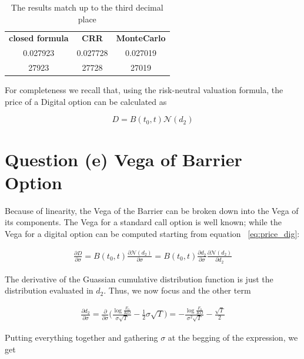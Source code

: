 \begin{table}[H]
    \centering
    \begin{tabular}{|| c | c | c ||}
    \hline
        \textbf{closed formula} & \textbf{CRR} & \textbf{MonteCarlo} \\
        0.027923 & 0.027728 & 0.027019 \\
        27923 & 27728 & 27019 \\
    \hline
    \end{tabular}
    \caption{The results match up to the third decimal place}
    \label{tab:price_call}
\end{table}

For completeness we recall that, using the risk-neutral valuation formula, the price of a Digital option can be calculated as


\begin{equation} \label{eq:price_dig}
    D = B(t_0,t) \mathcal{N}(d_2)
\end{equation}

\vspace{1 cm}
\section{Question (e) Vega of Barrier Option}
Because of linearity, the Vega of the Barrier can be broken down into the Vega of its components. The Vega for a standard call option is well known; while the Vega for a digital option can be computed starting from equation ~\ref{eq:price_dig}:

\begin{gather*}
    \frac{\partial D}{\partial \sigma} = B(t_0,t) \frac{\partial \mathcal{N}(d_2)}{\partial \sigma}
    =B(t_0,t) \frac{\partial d_2}{\partial \sigma} \frac{\partial \mathcal{N}(d_2)}{\partial d_2}
\end{gather*}

The derivative of the Guassian cumulative distribution function is just the distribution evaluated in $d_2$. Thus, we now focus and the other term

\begin{gather*}
    \frac{\partial d_2}{\partial \sigma} = \frac{\partial}{\partial \sigma} \Bigg( \frac{\log{\frac{F_0}{KO}}}{\sigma \sqrt{T}} - \frac{1}{2}\sigma \sqrt{T} \Bigg)
    = -\frac{\log{\frac{F_0}{KO}}}{\sigma^2 \sqrt{T}} - \frac{\sqrt{T}}{2}
\end{gather*}

Putting everything together and gathering $\sigma$ at the begging of the expression, we get

